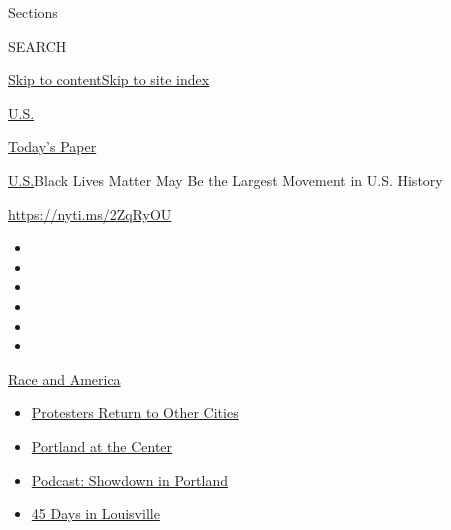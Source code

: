 Sections

SEARCH

\protect\hyperlink{site-content}{Skip to
content}\protect\hyperlink{site-index}{Skip to site index}

\href{https://www.nytimes3xbfgragh.onion/section/us}{U.S.}

\href{https://myaccount.nytimes3xbfgragh.onion/auth/login?response_type=cookie\&client_id=vi}{}

\href{https://www.nytimes3xbfgragh.onion/section/todayspaper}{Today's
Paper}

\href{/section/us}{U.S.}\textbar{}Black Lives Matter May Be the Largest
Movement in U.S. History

\url{https://nyti.ms/2ZqRyOU}

\begin{itemize}
\item
\item
\item
\item
\item
\item
\end{itemize}

\href{https://www.nytimes3xbfgragh.onion/news-event/george-floyd-protests-minneapolis-new-york-los-angeles?action=click\&pgtype=Article\&state=default\&region=TOP_BANNER\&context=storylines_menu}{Race
and America}

\begin{itemize}
\tightlist
\item
  \href{https://www.nytimes3xbfgragh.onion/2020/07/26/us/protests-portland-seattle-trump.html?action=click\&pgtype=Article\&state=default\&region=TOP_BANNER\&context=storylines_menu}{Protesters
  Return to Other Cities}
\item
  \href{https://www.nytimes3xbfgragh.onion/2020/07/24/us/portland-oregon-protests-white-race.html?action=click\&pgtype=Article\&state=default\&region=TOP_BANNER\&context=storylines_menu}{Portland
  at the Center}
\item
  \href{https://www.nytimes3xbfgragh.onion/2020/07/23/podcasts/the-daily/portland-protests.html?action=click\&pgtype=Article\&state=default\&region=TOP_BANNER\&context=storylines_menu}{Podcast:
  Showdown in Portland}
\item
  \href{https://www.nytimes3xbfgragh.onion/interactive/2020/07/16/us/black-lives-matter-protests-louisville-breonna-taylor.html?action=click\&pgtype=Article\&state=default\&region=TOP_BANNER\&context=storylines_menu}{45
  Days in Louisville}
\end{itemize}

